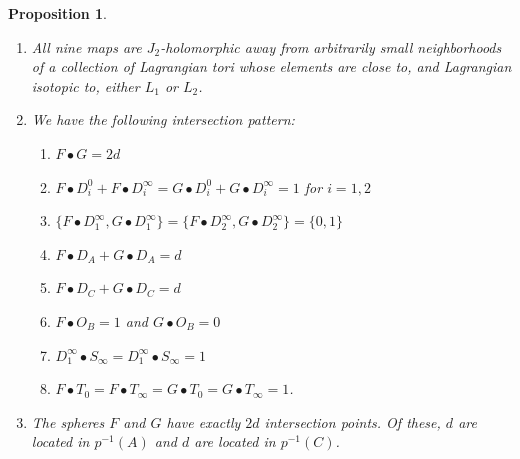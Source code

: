 \documentclass[10pt,a4paper]{amsart}
\newtheorem{proposition}{Proposition}
\begin{document}
\begin{proposition}
\begin{enumerate}
\item  All nine maps are $J_2$-holomorphic away from arbitrarily small neighborhoods of a collection of Lagrangian tori whose elements are close to, and Lagrangian isotopic to, either $L_1$ or $L_2$.\\

\item We have the following intersection pattern:\\
\begin{enumerate}
    \item $F \bullet G=2d$
    \item $F \bullet D^0_i + F \bullet D^\infty_i = G \bullet D^0_i + G \bullet D^\infty_i =1$ for $i=1,2$
    \item $\{F \bullet D^\infty_1, G \bullet D^\infty_1\} = \{F \bullet D^\infty_2, G \bullet D^\infty_2\} = \{0,1\}$    %
    \item $F \bullet D_A + G \bullet D_A = d$
    \item $F \bullet D_C + G \bullet D_C = d$
    \item $F \bullet O_B =1$ and $G \bullet O_B=0$
    \item $D^\infty_1 \bullet S_\infty = D^\infty_1 \bullet S_\infty =1$
    \item $F \bullet T_0 = F \bullet T_\infty=G \bullet T_0 = G \bullet T_\infty=1$.\\
\end{enumerate} 







\item The spheres $F$ and $G$ have exactly $2d$ intersection points. Of these, $d$ are located in $p^{-1}(A)$ and $d$ are located in $p^{-1}(C)$.\\

\end{enumerate} 



\end{proposition}
\end{document}
